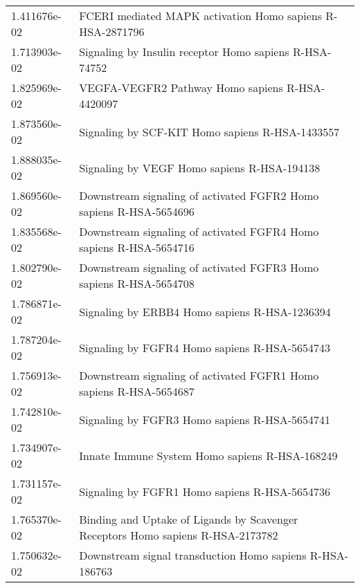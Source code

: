 \begin{longtable}{p{2.4cm}p{14.5cm}}
             1.411676e-02 &                                     FCERI mediated MAPK activation Homo sapiens R-HSA-2871796 \\
             1.713903e-02 &                                        Signaling by Insulin receptor Homo sapiens R-HSA-74752 \\
             1.825969e-02 &                                               VEGFA-VEGFR2 Pathway Homo sapiens R-HSA-4420097 \\
             1.873560e-02 &                                               Signaling by SCF-KIT Homo sapiens R-HSA-1433557 \\
             1.888035e-02 &                                                   Signaling by VEGF Homo sapiens R-HSA-194138 \\
             1.869560e-02 &                            Downstream signaling of activated FGFR2 Homo sapiens R-HSA-5654696 \\
             1.835568e-02 &                            Downstream signaling of activated FGFR4 Homo sapiens R-HSA-5654716 \\
             1.802790e-02 &                            Downstream signaling of activated FGFR3 Homo sapiens R-HSA-5654708 \\
             1.786871e-02 &                                                 Signaling by ERBB4 Homo sapiens R-HSA-1236394 \\
             1.787204e-02 &                                                 Signaling by FGFR4 Homo sapiens R-HSA-5654743 \\
             1.756913e-02 &                            Downstream signaling of activated FGFR1 Homo sapiens R-HSA-5654687 \\
             1.742810e-02 &                                                 Signaling by FGFR3 Homo sapiens R-HSA-5654741 \\
             1.734907e-02 &                                                Innate Immune System Homo sapiens R-HSA-168249 \\
             1.731157e-02 &                                                 Signaling by FGFR1 Homo sapiens R-HSA-5654736 \\
             1.765370e-02 &               Binding and Uptake of Ligands by Scavenger Receptors Homo sapiens R-HSA-2173782 \\
             1.750632e-02 &                                      Downstream signal transduction Homo sapiens R-HSA-186763 \\

\end{longtable}
